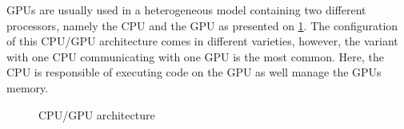 GPUs are usually used in a heterogeneous model containing two different processors, namely the CPU and the GPU as presented on \cref{fig:hw-cpu-gpu}.
The configuration of this CPU/GPU architecture comes in different varieties, however, the variant with one CPU communicating with one GPU is the most common.
Here, the CPU is responsible of executing code on the GPU as well manage the GPUs memory.

\begin{figure}[ht]
	\centering
	\caption{CPU/GPU architecture}
	\label{fig:hw-cpu-gpu}
\end{figure}











